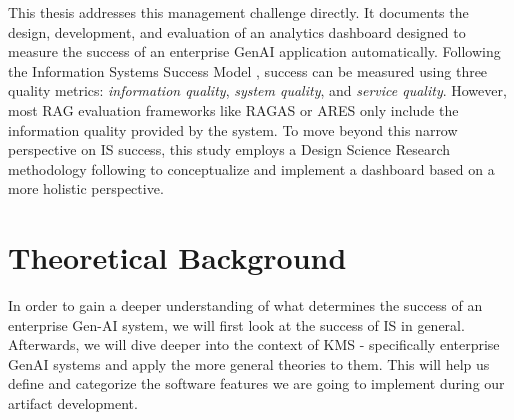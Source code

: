 \documentclass[
	english,
	ruledheaders=section,%
	class=report,%
	thesis={type=bachelor},%
	accentcolor=1b,%
	custommargins=true,%
	marginpar=false,%
	parskip=half-,%
	fontsize=11pt,%
	DIV=14,
]{tudapub}
\begin{document}
This thesis addresses this management challenge directly. It documents the design, development, and evaluation of an analytics dashboard designed to measure the success of an enterprise GenAI application automatically. Following the Information Systems Success Model \parencite{DeloneMcLean2003ISSuccessTenYearUpdate}, success can be measured using three quality metrics: \textit{information quality}, \textit{system quality}, and \textit{service quality}. However, most RAG evaluation frameworks like RAGAS \parencite{Es_James_Espinosa_Anke_Schockaert_2024} or ARES \parencite{Saad_Falcon_Khattab_Potts_Zaharia_2024} only include the information quality provided by the system. To move beyond this narrow perspective on IS success, this study employs a Design Science Research methodology following \cite{} to conceptualize and implement a dashboard based on a more holistic perspective.
\chapter{Theoretical Background}
In order to gain a deeper understanding of what determines the success of an enterprise Gen-AI system, we will first look at the success of IS in general. Afterwards, we will dive deeper into the context of KMS - specifically enterprise GenAI systems and apply the more general theories to them. This will help us define and categorize the software features we are going to implement during our artifact development.
\end{document}
